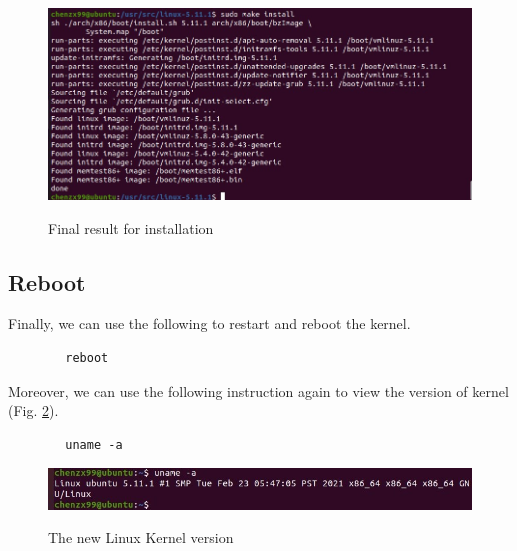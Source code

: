 \documentclass[a4paper, 12pt]{article}
\theoremstyle{definition}
\begin{document}
    \begin{figure}[htbp]
        \centering
        \includegraphics[width=7in]{./pic/exe1/pic5.jpg}\\
        \caption{Final result for installation}\label{fig5}
    \end{figure}

    \subsection{Reboot}

    Finally, we can use the following to restart and reboot the kernel.

    \begin{lstlisting}
        reboot
    \end{lstlisting}

    Moreover, we can use the following instruction again to view the version of kernel (Fig. \ref{fig6}). 

    \begin{lstlisting}
        uname -a
    \end{lstlisting}

    \begin{figure}[htbp]
        \centering
        \includegraphics[width=7in]{./pic/exe1/pic6.jpg}\\
        \caption{The new Linux Kernel version}\label{fig6}
    \end{figure}
\end{document}
